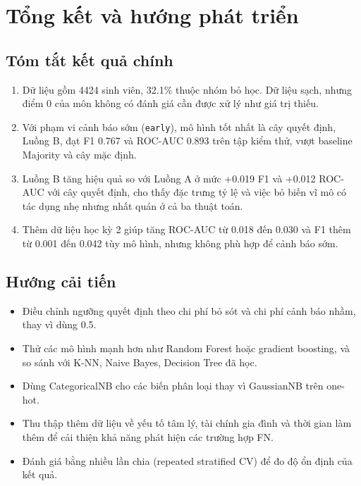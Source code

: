 \documentclass[12pt,a4paper]{article}
\begin{document}
\section{Tổng kết và hướng phát triển}

\subsection{Tóm tắt kết quả chính}
\begin{enumerate}
  \item Dữ liệu gồm 4424 sinh viên, 32.1\% thuộc nhóm bỏ học. Dữ liệu sạch, nhưng điểm 0 của môn không có đánh giá cần được xử lý như giá trị thiếu.
  \item Với phạm vi cảnh báo sớm (\texttt{early}), mô hình tốt nhất là cây quyết định, Luồng B, đạt F1 0.767 và ROC-AUC 0.893 trên tập kiểm thử, vượt baseline Majority và cây mặc định.
  \item Luồng B tăng hiệu quả so với Luồng A ở mức +0.019 F1 và +0.012 ROC-AUC với cây quyết định, cho thấy đặc trưng tỷ lệ và việc bỏ biến vĩ mô có tác dụng nhẹ nhưng nhất quán ở cả ba thuật toán.
  \item Thêm dữ liệu học kỳ 2 giúp tăng ROC-AUC từ 0.018 đến 0.030 và F1 thêm từ 0.001 đến 0.042 tùy mô hình, nhưng không phù hợp để cảnh báo sớm.
\end{enumerate}

\subsection{Hướng cải tiến}
\begin{itemize}
  \item Điều chỉnh ngưỡng quyết định theo chi phí bỏ sót và chi phí cảnh báo nhầm, thay vì dùng 0.5.
  \item Thử các mô hình mạnh hơn như Random Forest hoặc gradient boosting, và so sánh với K-NN, Naive Bayes, Decision Tree đã học.
  \item Dùng CategoricalNB cho các biến phân loại thay vì GaussianNB trên one-hot.
  \item Thu thập thêm dữ liệu về yếu tố tâm lý, tài chính gia đình và thời gian làm thêm để cải thiện khả năng phát hiện các trường hợp FN.
  \item Đánh giá bằng nhiều lần chia (repeated stratified CV) để đo độ ổn định của kết quả.
\end{itemize}
\end{document}

